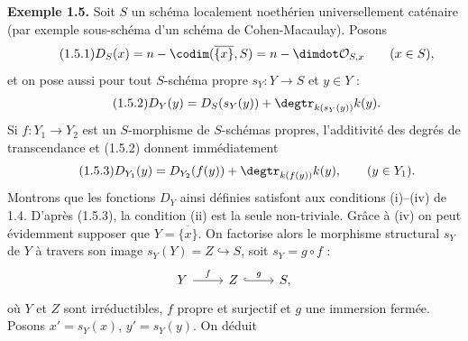 \textbf{Exemple 1.5.} Soit $S$ un schéma localement noethérien universellement caténaire (par exemple sous-schéma d'un schéma de Cohen-Macaulay). Posons
\begin{equation}\tag{1.5.1}
D_S(x)=n-\codim(\overline{\{x\}},S)=n-\dimdot\mathcal O_{S,x}\qquad(x\in S),
\end{equation}
et on pose aussi pour tout $S$-schéma propre $s_Y:Y\to S$ et $y\in Y$ :
\begin{equation}\tag{1.5.2}
D_Y(y)=D_S(s_Y(y))+\degtr_{k(s_Y(y))}k(y).
\end{equation}
Si $f:Y_1\to Y_2$ est un $S$-morphisme de $S$-schémas propres, l'additivité des degrés de transcendance et (1.5.2) donnent immédiatement
\begin{equation}\tag{1.5.3}
D_{Y_1}(y)=D_{Y_2}(f(y))+\degtr_{k(f(y))}k(y),\qquad(y\in Y_1).
\end{equation}
Montrons que les fonctions $D_Y$ ainsi définies satisfont aux conditions (i)--(iv) de 1.4. D'après (1.5.3), la condition (ii) est la seule non-triviale. Grâce à (iv) on peut évidemment supposer que $Y=\overline{\{x\}}$. On factorise alors le morphisme structural $s_Y$ de $Y$ à travers son image $s_Y(Y)=Z\hookrightarrow S$, soit $s_Y=g\circ f$ :
\[
\begin{tikzcd}
Y \arrow[r,"f"] & Z \arrow[r,hook,"g"] & S,
\end{tikzcd}
\]
où $Y$ et $Z$ sont irréductibles, $f$ propre et surjectif et $g$ une immersion fermée. Posons $x'=s_Y(x)$, $y'=s_Y(y)$. On déduit
